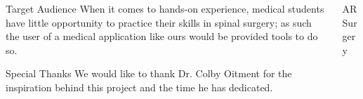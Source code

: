 \documentclass[final]{beamer}
\newlength{\onecolwid}
\begin{document}
\begin{frame}[t]
\begin{columns}[t]
\begin{column}{\onecolwid}


\begin{block}{\LARGE Target Audience}
\large
When it comes to hands-on experience, medical students have little opportunity to practice their skills in spinal surgery; as such the user of a medical application like ours would be provided tools to do so.
\end{block}



\begin{block}{\LARGE Special Thanks}
\large
We would like to thank Dr. Colby Oitment for the inspiration behind this project and the time he has dedicated.
\end{block}

\end{column} %

\begin{column}{\onecolwid} %



\begin{block}{\LARGE AR Surgery}


\end{block}
\end{column}
\end{columns}
\end{frame}
\end{document}

